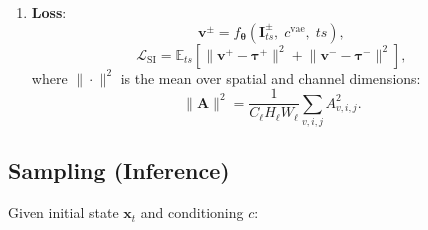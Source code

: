 \documentclass[11pt]{article}
\begin{document}
\begin{enumerate}
  \item \textbf{Loss}:
        \begin{equation}
          \mathbf{v}^{\pm}
          = f_{\bm{\theta}}\!\left(\mathbf{I}_{ts}^{\pm},\;c^{\mathrm{vae}},\;ts\right),
        \end{equation}
        \begin{equation}
          \boxed{
          \mathcal{L}_{\mathrm{SI}}
          = \mathbb{E}_{ts}\!\left[
              \bigl\|\mathbf{v}^+ - \bm{\tau}^+\bigr\|^2
            + \bigl\|\mathbf{v}^- - \bm{\tau}^-\bigr\|^2
            \right]},
        \end{equation}
        where $\|\cdot\|^2$ is the mean over spatial and channel dimensions:
        \begin{equation}
          \|\mathbf{A}\|^2
          = \frac{1}{C_\ell H_\ell W_\ell}
            \sum_{v,i,j} A_{v,i,j}^2.
        \end{equation}
\end{enumerate}

\subsection{Sampling (Inference)}

Given initial state $\mathbf{x}_t$ and conditioning $c$:
\end{document}
